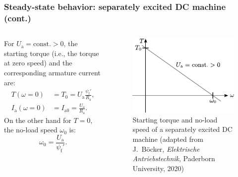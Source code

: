 \begin{frame}
	\frametitle{Steady-state behavior: separately excited DC machine (cont.)}
	\begin{columns}
		\begin{column}{0.55\textwidth}
		For $U_\mathrm{a}=\mbox{const.}>0$, the starting torque (i.e., the torque at zero speed) and the corresponding armature current are:
		\begin{equation}
			\begin{split}
				T(\omega=0) &= T_0 = U_\mathrm{a}\frac{\psi_\mathrm{f}'}{R_\mathrm{a}}, \\ I_\mathrm{a}(\omega=0) &= I_{\mathrm{a}0}=  \frac{U_\mathrm{a}}{R_\mathrm{a}}.
			\end{split}
		\end{equation} \pause
		On the other hand for $T=0$, the no-load speed $\omega_0$ is:
		\begin{equation}
			\omega_0 = \frac{U_\mathrm{a}}{\psi_\mathrm{f}'}.
		\end{equation} \pause
\end{column}
\hfill
\begin{column}{0.45\textwidth}
	\vspace{-0.2cm}
	\begin{figure}
		\centering
		\includegraphics{fig/lec03/Sep_DC_machine_starting_torque.pdf}
		\caption{Starting torque and no-load speed of a separately excited DC machine (adapted from J.~B\"ocker, \textit{Elektrische Antriebstechnik}, Paderborn University, 2020)}
	\end{figure}
\end{column}
\end{columns}		
\end{frame}

